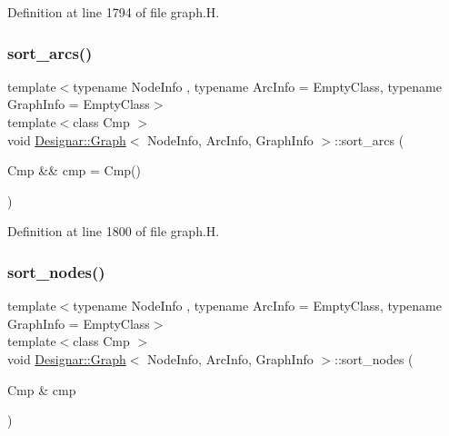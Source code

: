 Definition at line 1794 of file graph.\+H.

\mbox{\label{class_designar_1_1_graph_a37b5e36c96bf9efe44a0d6b83feb9656}} 
\subsubsection{\texorpdfstring{sort\+\_\+arcs()}{sort\_arcs()}\hspace{0.1cm}{\footnotesize\ttfamily [2/2]}}
{\footnotesize\ttfamily template$<$typename Node\+Info , typename Arc\+Info  = Empty\+Class, typename Graph\+Info  = Empty\+Class$>$ \\
template$<$class Cmp $>$ \\
void \hyperlink{class_designar_1_1_graph}{Designar\+::\+Graph}$<$ Node\+Info, Arc\+Info, Graph\+Info $>$\+::sort\+\_\+arcs (\begin{DoxyParamCaption}\item[{Cmp \&\&}]{cmp = {\ttfamily Cmp()} }\end{DoxyParamCaption})\hspace{0.3cm}{\ttfamily [inline]}}



Definition at line 1800 of file graph.\+H.

\mbox{\label{class_designar_1_1_graph_afcdce423516a879b23ec1b0fed201f20}} 
\subsubsection{\texorpdfstring{sort\+\_\+nodes()}{sort\_nodes()}\hspace{0.1cm}{\footnotesize\ttfamily [1/2]}}
{\footnotesize\ttfamily template$<$typename Node\+Info , typename Arc\+Info  = Empty\+Class, typename Graph\+Info  = Empty\+Class$>$ \\
template$<$class Cmp $>$ \\
void \hyperlink{class_designar_1_1_graph}{Designar\+::\+Graph}$<$ Node\+Info, Arc\+Info, Graph\+Info $>$\+::sort\+\_\+nodes (\begin{DoxyParamCaption}\item[{Cmp \&}]{cmp }\end{DoxyParamCaption})\hspace{0.3cm}{\ttfamily [inline]}}



